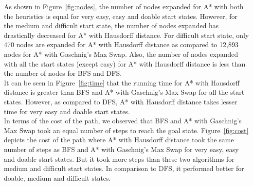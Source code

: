 \documentclass{svproc}
\begin{document}
\noindent As shown in Figure~\ref{fig:nodes}, the number of nodes expanded for A* with both the heuristics is equal for very easy, easy and doable start states. However, for the medium and difficult start state, the number of nodes expanded has drastically decreased for A* with Hausdorff distance. For difficult start state, only 470 nodes are expanded for A* with Hausdorff distance as compared to 12,893 nodes for A* with Gaschnig's Max Swap. Also, the number of nodes expanded with all the start states (except easy) for A* with Hausdorff distance is less than the number of nodes for BFS and DFS. \\

\noindent It can be seen in Figure~\ref{fig:time} that the running time for A* with Hausdorff distance is greater than BFS and A* with Gaschnig's Max Swap for all the start states. However, as compared to DFS,  A* with Hausdorff distance takes lesser time for very easy and doable start states. \\

\noindent In terms of the cost of the path, we observed that BFS and A* with Gaschnig's Max Swap took an equal number of steps to reach the goal state. Figure~\ref{fig:cost} depicts the cost of the path where A* with Hausdorff distance took the same number of steps as BFS and A* with Gaschnig's Max Swap for very easy, easy and doable start states.  But it took more steps than these two algorithms for medium and difficult start states. In comparison to DFS, it performed better for doable, medium and difficult states. \\
\end{document}
